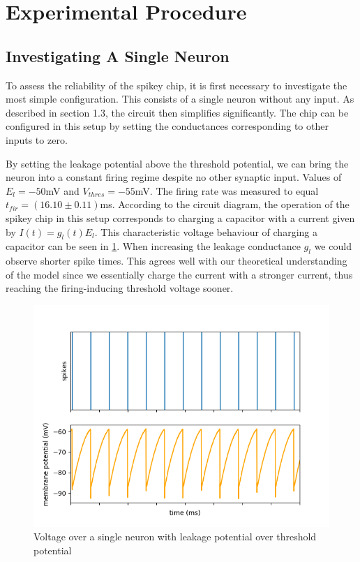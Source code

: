 \documentclass[10pt,a4paper]{article}
\begin{document}
\section{Experimental Procedure}

\subsection{Investigating A Single Neuron}
To assess the reliability of the spikey chip, it is first necessary to investigate
the most simple configuration. This consists of a single neuron without any
input.  As described in section 1.3,  the circuit then simplifies significantly.
The chip can be configured in this setup by setting the conductances
corresponding to other inputs to zero.  \par
By setting the leakage potential above the threshold potential, we can bring
the neuron into a constant firing regime despite no other synaptic input.
Values of $E_l = -50$mV and $V_{thres} = -55$mV.  The firing rate was
measured to equal $t_{fir} = (16.10\pm0.11)$ms.  According to the circuit
diagram,  the operation of the spikey chip in this setup corresponds to
charging a capacitor with a current given by $I(t) = g_l(t)E_l$.  This
characteristic voltage behaviour of charging a capacitor can be seen
in \ref{fig:membranes_ex1}.  When increasing the leakage conductance $g_l$ we
could observe shorter spike times.  This agrees well with our theoretical
understanding of the model since we essentially charge the current with a
stronger current,  thus reaching the firing-inducing threshold voltage sooner.
\begin{figure}[ht]
    \centering
    \includegraphics[width=\textwidth]{figures/fp_task1_1membrane.png}
    \caption{Voltage over a single neuron with leakage potential over threshold potential}
    \label{fig:membranes_ex1}
\end{figure}
\end{document}
